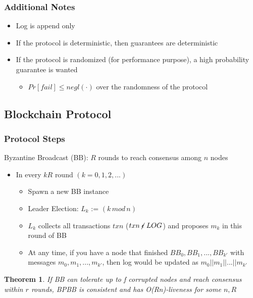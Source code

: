 \documentclass[twoside]{article}
\newcounter{lecnum}
\newtheorem{theorem}{Theorem}[lecnum]
\begin{document}
\subsubsection{Additional Notes}
\begin{itemize}
    \item Log is append only
    \item If the protocol is deterministic, then guarantees are deterministic
    \item If the protocol is randomized (for performance purpose), a high probability guarantee is wanted
    \begin{itemize}
        \item $Pr[fail] \leq negl(\cdot)$ over the randomness of the protocol
    \end{itemize}
\end{itemize}

\subsection{Blockchain Protocol}
\subsubsection{Protocol Steps}
Byzantine Broadcast (BB): $R$ rounds to reach consensus among $n$ nodes

\begin{itemize}
    \item In every $kR$ round $(k = 0, 1, 2, ...)$
    \begin{itemize}
        \item Spawn a new BB instance
        \item Leader Election: $L_k$ := $(k \, mod \, n)$
        \item $L_k$ collects all transactions $txn$ ($txn \centernot\epsilon LOG$) and proposes $m_k$ in this round of BB
        \item At any time, if you have a node that finished $BB_0, BB_1, ..., BB_{k'} $ with messages $m_0, m_1, ..., m_{k'}$, then log would be updated as $m_0 || m_1 || ... || m_{k'} $
    \end{itemize}
\end{itemize}

\begin{theorem}
If BB can tolerate up to f corrupted nodes and reach consensus within $r$ rounds, BPBB is consistent and has O(Rn)-liveness for some $n ,R$
\end{theorem}
\end{document}

